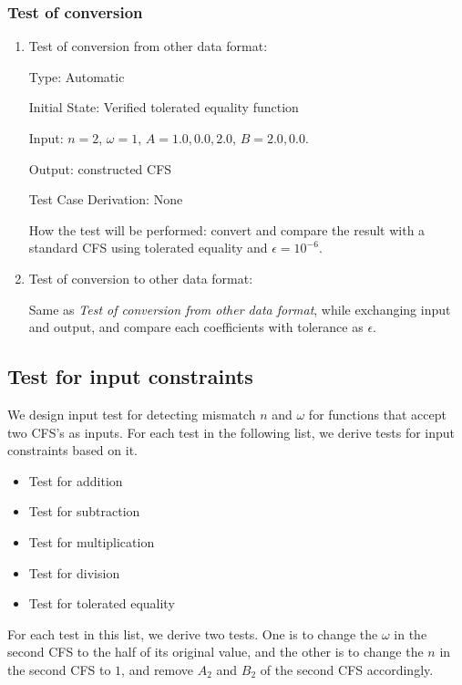 \documentclass[12pt, titlepage]{article}
\begin{document}
\subsubsection{Test of conversion}

\begin{enumerate}
	\item{Test of conversion from other data format:\\}
	
	Type: Automatic
	
	Initial State: Verified tolerated equality function
	
	Input: $n=2$, $\omega=1$, $A={1.0, 0.0, 2.0}$, $B={2.0, 0.0}$.
	
	Output: constructed CFS
	
	Test Case Derivation: None
	
	How the test will be performed: convert and compare the result with a standard CFS using tolerated equality and $\epsilon=10^{-6}$.
	
	\item{Test of conversion to other data format:\\}
	
	Same as \textit{Test of conversion from other data format}, while exchanging input and output, and compare each coefficients with tolerance as $\epsilon$.
	
\end{enumerate}
\subsection{Test for input constraints}
We design input test for detecting mismatch $n$ and $\omega$ for functions that accept two CFS's as inputs. For each test in the following list, we derive tests for input constraints based on it.

\begin{itemize}
	\item Test for addition
	\item Test for subtraction
	\item Test for multiplication
	\item Test for division
	\item Test for tolerated equality
\end{itemize}

For each test in this list, we derive two tests. One is to change the $\omega$ in the second CFS to the half of its original value, and the other is to change the $n$ in the second CFS to $1$, and remove $A_2$ and $B_2$ of the second CFS accordingly.
\end{document}
